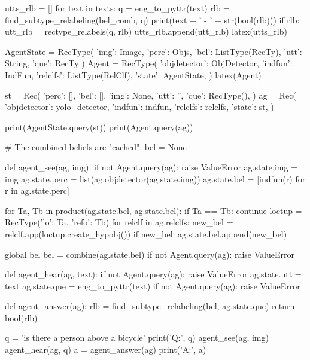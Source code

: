 \begin{cell}
utts_rlb = []
for text in texts:
    q = eng_to_pyttr(text)
    rlb = find_subtype_relabeling(bel_comb, q)
    print(text + ' - ' + str(bool(rlb)))
    if rlb:
        utt_rlb = rectype_relabels(q, rlb)
        utts_rlb.append(utt_rlb)
latex(utts_rlb)
\end{cell}

\begin{cell}
AgentState = RecType({
    'img': Image,
    'perc': Objs,
    'bel': ListType(RecTy),
    'utt': String,
    'que': RecTy
})
Agent = RecType({
    'objdetector': ObjDetector,
    'indfun': IndFun,
    'relclfs': ListType(RelClf),
    'state': AgentState,
})
latex(Agent)
\end{cell}

\begin{cell}
st = Rec({
    'perc': [],
    'bel': [],
    'img': None,
    'utt': '',
    'que': RecType(),
})
ag = Rec({
    'objdetector': yolo_detector,
    'indfun': indfun,
    'relclfs': relclfs,
    'state': st,
})

print(AgentState.query(st))
print(Agent.query(ag))
\end{cell}

\begin{cell}
# The combined beliefs are "cached".
bel = None

def agent_see(ag, img):
    if not Agent.query(ag): raise ValueError
    ag.state.img = img
    ag.state.perc = list(ag.objdetector(ag.state.img))
    ag.state.bel = [indfun(r) for r in ag.state.perc]
    
    for Ta, Tb in product(ag.state.bel, ag.state.bel):
        if Ta == Tb: continue
        loctup = RecType({'lo': Ta, 'refo': Tb})
        for relclf in ag.relclfs:
            new_bel = relclf.app(loctup.create_hypobj())
            if new_bel:
                ag.state.bel.append(new_bel)
                
    global bel
    bel = combine(ag.state.bel)
    if not Agent.query(ag): raise ValueError

def agent_hear(ag, text):
    if not Agent.query(ag): raise ValueError
    ag.state.utt = text
    ag.state.que = eng_to_pyttr(text)
    if not Agent.query(ag): raise ValueError

def agent_answer(ag):
    rlb = find_subtype_relabeling(bel, ag.state.que)
    return bool(rlb)

q = 'is there a person above a bicycle'
print('Q:', q)
agent_see(ag, img)
agent_hear(ag, q)
a = agent_answer(ag)
print('A:', a)
\end{cell}

